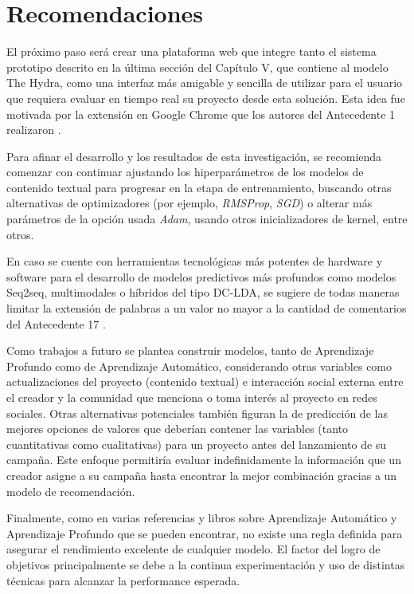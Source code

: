 \section{Recomendaciones}
El próximo paso será crear una plataforma web que integre tanto el sistema prototipo descrito en la última sección del Capítulo V, que contiene al modelo The Hydra, como una interfaz más amigable y sencilla de utilizar para el usuario que requiera evaluar en tiempo real su proyecto desde esta solución. Esta idea fue motivada por la extensión en Google Chrome que los autores del Antecedente 1 realizaron \parencite{pr_chen2013kickpredict}.

Para afinar el desarrollo y los resultados de esta investigación, se recomienda comenzar con continuar ajustando los hiperparámetros de los modelos de contenido textual para progresar en la etapa de entrenamiento, buscando otras alternativas de optimizadores (por ejemplo, \textit{RMSProp}, \textit{SGD}) o alterar más parámetros de la opción usada \textit{Adam}, usando otros inicializadores de kernel, entre otros.

En caso se cuente con herramientas tecnológicas más potentes de hardware y software para el desarrollo de modelos predictivos más profundos como modelos Seq2seq, multimodales o híbridos del tipo DC-LDA, se sugiere de todas maneras limitar la extensión de palabras a un valor no mayor a la cantidad de comentarios del Antecedente 17 \parencite{pr_shafqat2019topicpredictions}.

Como trabajos a futuro se plantea construir modelos, tanto de Aprendizaje Profundo como de Aprendizaje Automático, considerando otras variables como actualizaciones del proyecto (contenido textual) e interacción social externa entre el creador y la comunidad que menciona o toma interés al proyecto en redes sociales. Otras alternativas potenciales también figuran la de predicción de las mejores opciones de valores que deberían contener las variables (tanto cuantitativas como cualitativas) para un proyecto antes del lanzamiento de su campaña. Este enfoque permitiría evaluar indefinidamente la información que un creador asigne a su campaña hasta encontrar la mejor combinación gracias a un modelo de recomendación.

Finalmente, como en varias referencias y libros sobre Aprendizaje Automático y Aprendizaje Profundo que se pueden encontrar, no existe una regla definida para asegurar el rendimiento excelente de cualquier modelo. El factor del logro de objetivos principalmente se debe a la continua experimentación y uso de distintas técnicas para alcanzar la performance esperada.